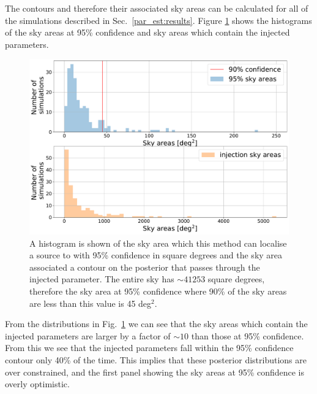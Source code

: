 The contours and therefore their associated sky areas can be calculated for all of the simulations described in Sec.~\ref{par_est:results}. 
Figure \ref{par_est:results:sky_area} shows the histograms of the sky areas at 95\% confidence and sky areas which contain the injected parameters.
%
\begin{figure}[ht]
    \centering
    \includegraphics[width=\linewidth]{C5_parameter/sky_area_hist.pdf}
    \caption[p-p plot for the CW simulations]{A histogram is shown of the sky area which this method can localise a source to with 95\% confidence in square degrees and the sky area associated a contour on the posterior that passes through the injected parameter. The entire sky has $\sim 41253$ square degrees, therefore the sky area at 95\% confidence where 90\% of the sky areas are less than this value is 45 deg$^2$.  }
    \label{par_est:results:sky_area}
\end{figure}
%
From the distributions in Fig.~\ref{par_est:results:sky_area} we can see that the sky areas which contain the injected parameters are larger by a factor of $\sim 10$ than those at 95\% confidence.
From this we see that the injected parameters fall within the 95\% confidence contour only 40\% of the time.
This implies that these posterior distributions are over constrained, and the first panel showing the sky areas at 95\% confidence is overly optimistic. \textbf{}

